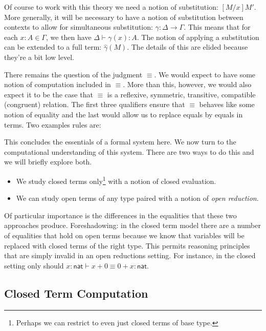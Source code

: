 \documentclass{article}
\newcommand{\hasEF}[3]{\ensuremath{#1 \vdash #2 : #3}}
\newcommand{\hasEEF}[4]{\ensuremath{#1 \vdash #2 \equiv #3 : #4}}
\newcommand{\fn}[2]{\ensuremath{#1 \to #2}}
\newcommand{\nat}{\ensuremath{\mathsf{nat}}}
\newcommand{\ap}[2]{\ensuremath{#1\ #2}}
\newcommand{\lam}[3]{\ensuremath{\lambda #1 {:} #2.\, #3}}
\begin{document}
Of course to work with this theory we need a notion of substitution:
$[M/x]M'$. More generally, it will be necessary to have a notion of
substitution between contexts to allow for simultaneous substitution:
$\gamma : \Delta \to \Gamma$. This means that for each
$x : A \in \Gamma$, we then have $\hasEF{\Delta}{\gamma(x)}{A}$. The
notion of applying a substitution can be extended to a full term:
$\hat{\gamma}(M)$. The details of this are elided because they're a
bit low level.

There remains the question of the judgment $\equiv$. We would expect
to have some notion of computation included in $\equiv$. More than
this, however, we would also expect it to be the case that $\equiv$ is
a reflexive, symmetric, transitive, compatible (congruent)
relation. The first three qualifiers ensure that $\equiv$ behaves like
some notion of equality and the last would allow us to replace equals
by equals in terms. Two examples rules are:
This concludes the essentials of a formal system here. We now turn to
the computational understanding of this system. There are two ways to
do this and we will briefly explore both.
\begin{itemize}
\item We study closed terms only\footnote{Perhaps we can restrict
  to even just closed terms of base type.} with a notion of closed
  evaluation.
\item We can study open terms of any type paired with a notion of
  \emph{open reduction}.
\end{itemize}
Of particular importance is the differences in the equalities that these two
approaches produce. Foreshadowing: in the closed term model there are
a number of equalities that hold on open terms because we know that
variables will be replaced with closed terms of the right type. This
permits reasoning principles that are simply invalid in an open
reductions setting. For instance, in the closed setting only should
$\hasEEF{x: \nat}{x + 0}{0 + x}{\nat}$.

\subsection{Closed Term Computation}
\end{document}
